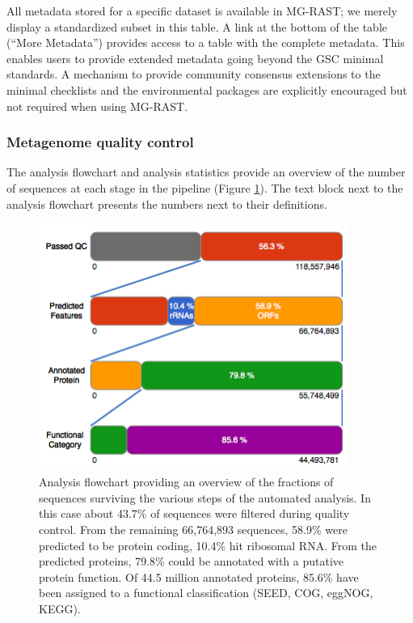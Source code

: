 \documentclass[12pt,fullpage]{report}
\begin{document}
All metadata stored for a specific dataset is available in MG-RAST; we merely display a standardized subset in this table. A link at the bottom of the table (``More Metadata'') provides access to a table with the complete metadata. This enables users to provide extended metadata going beyond the GSC minimal standards. A mechanism to provide community consensus extensions to the minimal checklists and the environmental packages are explicitly encouraged but not required when using MG-RAST.
\subsubsection{Metagenome quality control}

The analysis flowchart and analysis statistics provide an overview of the number of sequences at each stage in the pipeline (Figure \ref{fig:analysis-flowchart}). The text block next to the analysis flowchart presents the numbers next to their definitions.
\begin{figure}
\begin{center}
\includegraphics[width=4in]{Images/analysis-flowchart.png}
\end{center}
\caption{
Analysis flowchart providing an overview of the fractions of sequences surviving the various steps of the automated analysis. In this case about 43.7\% of sequences were filtered during quality control. From the remaining 66,764,893 sequences, 58.9\% were predicted to be protein coding, 10.4\% hit ribosomal RNA. From the predicted proteins, 79.8\% could be annotated with a putative protein function. Of 44.5 million annotated proteins, 85.6\% have been assigned to a functional classification (\gls{SEED}, COG, eggNOG, KEGG).
}
\label{fig:analysis-flowchart}
\end{figure}
\end{document}
